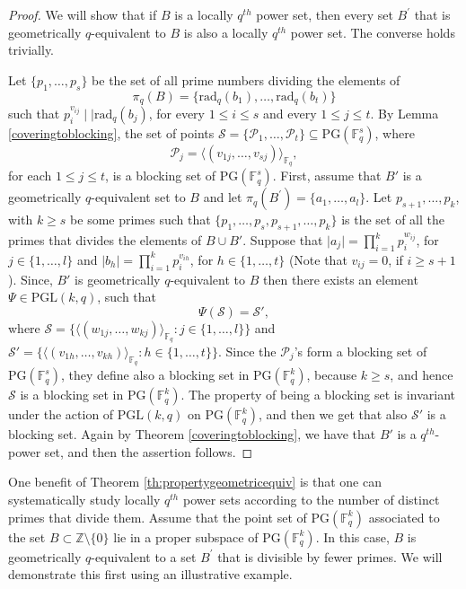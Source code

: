 \documentclass[12pt]{amsart}
\newcommand{\F}{{\mathbb F}}
\newcommand{\PG}{\mathrm{PG}}
\newcommand{\rad}{\mathrm{rad}_q}
\begin{document}
\begin{proof}
    We will show that if $B$ is a locally $q^{th}$ power set, then every set $B^{\prime}$ that is geometrically $q$-equivalent to $B$ is also a locally $q^{th}$ power set. The converse holds trivially.
    
    Let $ \{p_1,\ldots,p_s\}$ be the set of all prime numbers dividing the elements of \[\pi_q(B)=\{ 
    \rad( b_1 ),\ldots,\rad( b_t )
    \} \] such that $p_i^{v_{ij}} \mid \mid \rad( b_j )$, for every $1\leq i \leq s$ and every $1 \leq j \leq t$. By Lemma \ref{coveringtoblocking}, the set of points $\mathcal{S}=\{\mathcal{P}_1,\ldots,\mathcal{P}_t\} \subseteq \PG(\F_{q}^{s})$, where 
        \[
        \mathcal{P}_j=\langle (v_{1j},\ldots,v_{sj}) \rangle_{\F_q}
        ,\]
        for each $1 \leq j \leq t$, is a blocking set of $\PG(\F_{q}^{s})$. First, assume that $B'$ is a geometrically $q$-equivalent set to $B$ and let $\pi_{q}(B^{\prime}) = \{a_1, \ldots, a_l\}$. Let $p_{s+1}, \ldots, p_{k}$, with $k \geq s$ be some primes such that $\{p_1,\ldots,p_s,p_{s+1},\ldots,p_k\}$ is the set of all the primes that divides the elements of $B \cup B'$. Suppose that $\lvert a_j \rvert=\prod_{i=1}^k p_i^{w_{ij}}$, for $j \in \{1,\ldots,l\}$ and $\lvert b_h \rvert=\prod_{i=1}^kp_i^{v_{ih}}$, for $h \in \{1,\ldots,t\}$ (Note that $v_{ij}=0$, if $i \geq s+1$). Since, $B'$ is geometrically $q$-equivalent to $B$ then there exists an element $\Psi \in \mathrm{PGL}(k,q)$, such that 
    \[\Psi(\mathcal{S})=\mathcal{S}',\]
    where $\mathcal{S}=\{\langle (w_{1j},\ldots,w_{kj}) \rangle_{\F_q} \colon j \in \{1,\ldots,l\}\}$ and  $\mathcal{S}'=\{\langle (v_{1h},\ldots,v_{kh}) \rangle_{\F_q} \colon h \in \{1,\ldots,t\}\}$. Since the $\mathcal{P}_j$'s form a blocking set of $\PG(\F_{q}^{s})$, they define also a blocking set in $\PG(\F_{q}^{k})$, because $k \geq s$, and hence $\mathcal{S}$ is a blocking set in $\PG(\F_{q}^{k})$. The property of being a blocking set is invariant under the action of $\mathrm{PGL}(k,q)$ on $\PG(\F_q^k)$, and then we get that also $\mathcal{S}'$ is a blocking set. Again by Theorem \ref{coveringtoblocking}, we have that $B'$ is a $q^{th}$-power set, and then the assertion follows. 
\end{proof}
One benefit of Theorem \ref{th:propertygeometricequiv} is that one can systematically study locally $q^{th}$ power sets according to the number of distinct primes that divide them. Assume that the point set of $\PG(\F_{q}^{k})$ associated to the set $B \subset\mathbb{Z}\setminus\{0\}$ lie in a proper subspace of $\PG(\F_{q}^{k})$. In this case,  $B$ is geometrically $q$-equivalent to a set $B^{\prime}$ that is divisible by fewer primes. We will demonstrate this first using an illustrative example.  
\end{document}
